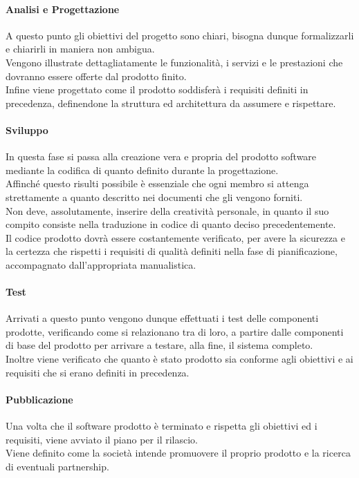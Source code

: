 \paragraph{Analisi e Progettazione}
A questo punto gli obiettivi del progetto sono chiari, bisogna dunque formalizzarli e chiarirli in maniera non ambigua.\\
Vengono illustrate dettagliatamente le funzionalità, i servizi e le prestazioni che dovranno essere offerte dal prodotto finito.\\
Infine viene progettato come il prodotto soddisferà i requisiti definiti in precedenza, definendone la struttura ed architettura da assumere e rispettare.

\paragraph{Sviluppo}
In questa fase si passa alla creazione vera e propria del prodotto software mediante la codifica di quanto definito durante la progettazione.\\
Affinché questo risulti possibile è essenziale che ogni membro si attenga strettamente a quanto descritto nei documenti che gli vengono forniti.\\
Non deve, assolutamente, inserire della creatività personale, in quanto il suo compito consiste nella traduzione in codice di quanto deciso precedentemente.\\
Il codice prodotto dovrà essere costantemente verificato, per avere la sicurezza e la certezza che rispetti i requisiti di qualità definiti nella fase di pianificazione, accompagnato dall'appropriata manualistica.

\paragraph{Test}
Arrivati a questo punto vengono dunque effettuati i test delle componenti prodotte, verificando come si relazionano tra di loro, a partire dalle componenti di base del prodotto per arrivare a testare, alla fine, il sistema completo.\\
Inoltre viene verificato che quanto è stato prodotto sia conforme agli obiettivi e ai requisiti che si erano definiti in precedenza.

\paragraph{Pubblicazione}
Una volta che il software prodotto è terminato e rispetta gli obiettivi ed i requisiti, viene avviato il piano per il rilascio.\\
Viene definito come la società intende promuovere il proprio prodotto e la ricerca di eventuali partnership.

